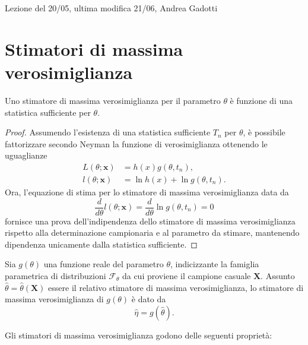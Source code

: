 
Lezione del 20/05, ultima modifica 21/06, Andrea Gadotti

\section{Stimatori di massima verosimiglianza}

\begin{prp}
  Uno stimatore di massima verosimiglianza per il parametro \(\theta\) è
  funzione di una statistica sufficiente per \(\theta\).
\end{prp}
\begin{proof}
  Assumendo l'esistenza di una statistica sufficiente \(T_n\) per \(\theta\),
  è possibile fattorizzare secondo Neyman la funzione di verosimiglianza
  ottenendo le uguaglianze
  \begin{align*}
    L(\theta;\mathbf{x}) &= h(x)g(\theta,t_n), \\
    l(\theta;\mathbf{x}) &= \ln h(x) + \ln g(\theta,t_n).
  \end{align*}
  Ora, l'equazione di stima per lo stimatore di massima verosimiglianza
  data da
  \begin{equation*}
    \frac{d}{d\theta}l(\theta;\mathbf{x}) =
    \frac{d}{d\theta}\ln g(\theta,t_n) = 0
  \end{equation*}
  fornisce una prova dell'indipendenza dello stimatore di massima verosimiglianza rispetto alla determinazione campionaria e al parametro
  da stimare, mantenendo dipendenza unicamente dalla statistica sufficiente.
\end{proof}

\begin{prp}
  Sia \(g(\theta)\) una funzione reale del parametro \(\theta\),
  indicizzante la famiglia parametrica di distribuzioni \(\mathcal{F}_\theta\)
  da cui proviene il campione casuale \(\mathbf{X}\).
  Assunto \(\hat{\theta} = \hat{\theta}(\mathbf{X})\) essere il relativo
  stimatore di massima verosimiglianza, lo stimatore di massima
  verosimiglianza di \(g(\theta)\) è dato da
  \begin{equation}
    \hat{\eta} = g(\hat{\theta}).
  \end{equation}  
\end{prp}

Gli stimatori di massima verosimiglianza godono delle seguenti proprietà:

